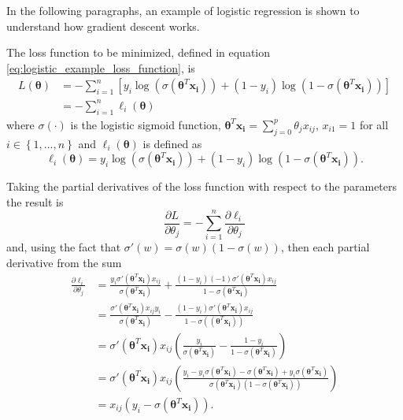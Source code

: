 In the following paragraphs, an example of logistic regression is shown to understand how gradient descent works.

The loss function to be minimized, defined in equation \eqref{eq:logistic_example_loss_function}, is
\begin{equation}
  \begin{split}
    L(\boldsymbol{\theta}) & = - \sum_{i=1}^{n} \left[ y_i \log(\sigma(\boldsymbol{\theta}^T \boldsymbol{x_i})) + (1-y_i) \log(1-\sigma(\boldsymbol{\theta}^T \boldsymbol{x_i})) \right] \\
    & = - \sum_{i=1}^{n}{\ell_i(\boldsymbol{\theta})}
  \end{split}
\end{equation}
where $\sigma(\cdot)$ is the logistic sigmoid function, $\boldsymbol{\theta}^T \boldsymbol{x_i} = \sum_{j=0}^{p}{\theta_j x_{ij}}$, $x_{i1} = 1$ for all $i \in \left\{1, ..., n \right\}$ and $\ell_i(\boldsymbol{\theta})$ is defined as
\begin{equation}
  \ell_i(\boldsymbol{\theta}) = y_i \log(\sigma(\boldsymbol{\theta}^T \boldsymbol{x_i})) + (1-y_i) \log(1-\sigma(\boldsymbol{\theta}^T \boldsymbol{x_i})).
\end{equation}

Taking the partial derivatives of the loss function with respect to the parameters the result is
\begin{equation}
  \frac{\partial L}{\partial \theta_j} = - \sum_{i = 1}^n { \frac{\partial \ell_i}{\partial \theta_j} }
\end{equation}
and, using the fact that $\sigma'(w) = \sigma(w)(1-\sigma(w))$, then each partial derivative from the sum
\begin{equation}
  \begin{split}
    \frac{\partial \ell_i}{\partial \theta_j} & =
    \frac{y_i \sigma'(\boldsymbol{\theta}^T \boldsymbol{x_i}) x_{ij} }  {\sigma(\boldsymbol{\theta}^T \boldsymbol{x_i})} + \frac{(1 - y_i) (-1) \sigma'(\boldsymbol{\theta}^T \boldsymbol{x_i}) x_{ij}} {1 - \sigma(\boldsymbol{\theta}^T \boldsymbol{x_i})} \\
    & = \frac{\sigma'(\boldsymbol{\theta}^T \boldsymbol{x_i}) x_{ij} y_i}{\sigma(\boldsymbol{\theta}^T \boldsymbol{x_i})} - \frac{(1 - y_i) \sigma'(\boldsymbol{\theta}^T \boldsymbol{x_i}) x_{ij}}{1 - \sigma((\boldsymbol{\theta}^T \boldsymbol{x_i}))} \\
    & = \sigma'(\boldsymbol{\theta}^T \boldsymbol{x_i}) x_{ij} \left(\frac{y_i}{\sigma(\boldsymbol{\theta}^T \boldsymbol{x_i})} - \frac{1-y_i}{1-\sigma(\boldsymbol{\theta}^T \boldsymbol{x_i})} \right) \\
    & = \sigma'(\boldsymbol{\theta}^T \boldsymbol{x_i}) x_{ij} \left(\frac{y_i - y_i \sigma(\boldsymbol{\theta}^T \boldsymbol{x_i}) -
    \sigma(\boldsymbol{\theta}^T \boldsymbol{x_i}) + y_i \sigma(\boldsymbol{\theta}^T \boldsymbol{x_i})}{\sigma(\boldsymbol{\theta}^T \boldsymbol{x_i})(1-\sigma(\boldsymbol{\theta}^T \boldsymbol{x_i}))} \right) \\
    & = x_{ij}(y_i - \sigma(\boldsymbol{\theta}^T \boldsymbol{x_i})).
  \end{split}
\end{equation}

